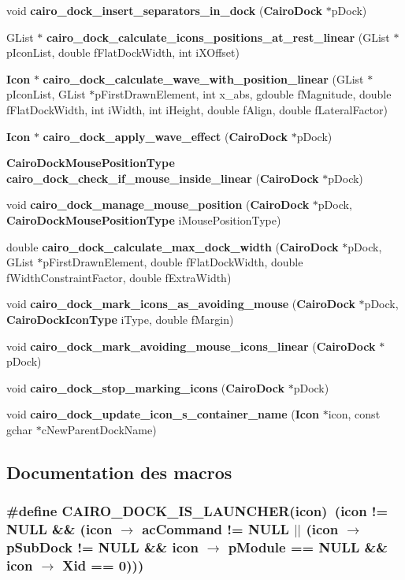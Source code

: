 \begin{CompactItemize}
void {\bf cairo\_\-dock\_\-insert\_\-separators\_\-in\_\-dock} ({\bf CairoDock} $\ast$pDock)
\item 
GList $\ast$ {\bf cairo\_\-dock\_\-calculate\_\-icons\_\-positions\_\-at\_\-rest\_\-linear} (GList $\ast$pIconList, double fFlatDockWidth, int iXOffset)
\item 
{\bf Icon} $\ast$ {\bf cairo\_\-dock\_\-calculate\_\-wave\_\-with\_\-position\_\-linear} (GList $\ast$pIconList, GList $\ast$pFirstDrawnElement, int x\_\-abs, gdouble fMagnitude, double fFlatDockWidth, int iWidth, int iHeight, double fAlign, double fLateralFactor)
\item 
{\bf Icon} $\ast$ {\bf cairo\_\-dock\_\-apply\_\-wave\_\-effect} ({\bf CairoDock} $\ast$pDock)
\item 
{\bf CairoDockMousePositionType} {\bf cairo\_\-dock\_\-check\_\-if\_\-mouse\_\-inside\_\-linear} ({\bf CairoDock} $\ast$pDock)
\item 
void {\bf cairo\_\-dock\_\-manage\_\-mouse\_\-position} ({\bf CairoDock} $\ast$pDock, {\bf CairoDockMousePositionType} iMousePositionType)
\item 
double {\bf cairo\_\-dock\_\-calculate\_\-max\_\-dock\_\-width} ({\bf CairoDock} $\ast$pDock, GList $\ast$pFirstDrawnElement, double fFlatDockWidth, double fWidthConstraintFactor, double fExtraWidth)
\item 
void {\bf cairo\_\-dock\_\-mark\_\-icons\_\-as\_\-avoiding\_\-mouse} ({\bf CairoDock} $\ast$pDock, {\bf CairoDockIconType} iType, double fMargin)
\item 
void {\bf cairo\_\-dock\_\-mark\_\-avoiding\_\-mouse\_\-icons\_\-linear} ({\bf CairoDock} $\ast$pDock)
\item 
void {\bf cairo\_\-dock\_\-stop\_\-marking\_\-icons} ({\bf CairoDock} $\ast$pDock)
\item 
void {\bf cairo\_\-dock\_\-update\_\-icon\_\-s\_\-container\_\-name} ({\bf Icon} $\ast$icon, const gchar $\ast$cNewParentDockName)
\end{CompactItemize}


\subsection{Documentation des macros}
\subsubsection{\setlength{\rightskip}{0pt plus 5cm}\#define CAIRO\_\-DOCK\_\-IS\_\-LAUNCHER(icon)~(icon != NULL \&\& (icon $\rightarrow$ acCommand != NULL $|$$|$ (icon $\rightarrow$ pSubDock != NULL \&\& icon $\rightarrow$ pModule == NULL \&\& icon $\rightarrow$ Xid == 0)))}\label{cairo-dock-icons_8h_168c94ad9d2454c1b5184144ce14619b}



